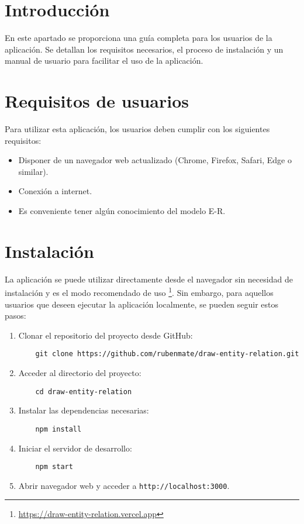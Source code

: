 
\section{Introducción}
En este apartado se proporciona una guía completa para los usuarios de la aplicación. Se detallan los requisitos necesarios, el proceso de instalación y un manual de usuario para facilitar el uso de la aplicación.

\section{Requisitos de usuarios}
Para utilizar esta aplicación, los usuarios deben cumplir con los siguientes requisitos:
\begin{itemize}
    \item Disponer de un navegador web actualizado (Chrome, Firefox, Safari, Edge o similar).
    \item Conexión a internet.
    \item Es conveniente tener algún conocimiento del modelo E-R.
\end{itemize}

\section{Instalación}
La aplicación se puede utilizar directamente desde el navegador sin necesidad de instalación y es el modo recomendado de uso \footnote{\url{https://draw-entity-relation.vercel.app}}. Sin embargo, para aquellos usuarios que deseen ejecutar la aplicación localmente, se pueden seguir estos pasos:

\begin{enumerate}
    \item Clonar el repositorio del proyecto desde GitHub:
    \begin{verbatim}
    git clone https://github.com/rubenmate/draw-entity-relation.git
    \end{verbatim}
    \item Acceder al directorio del proyecto:
    \begin{verbatim}
    cd draw-entity-relation
    \end{verbatim}
    \item Instalar las dependencias necesarias:
    \begin{verbatim}
    npm install
    \end{verbatim}
    \item Iniciar el servidor de desarrollo:
    \begin{verbatim}
    npm start
    \end{verbatim}
    \item Abrir navegador web y acceder a \texttt{http://localhost:3000}.
\end{enumerate}

